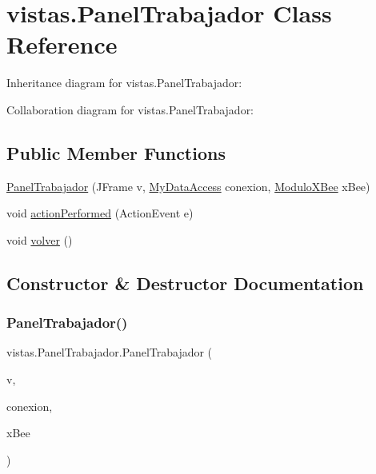 \hypertarget{classvistas_1_1_panel_trabajador}{}\section{vistas.\+Panel\+Trabajador Class Reference}
\label{classvistas_1_1_panel_trabajador}


Inheritance diagram for vistas.\+Panel\+Trabajador\+:


Collaboration diagram for vistas.\+Panel\+Trabajador\+:
\subsection*{Public Member Functions}
\begin{DoxyCompactItemize}
\item 
\mbox{\hyperlink{classvistas_1_1_panel_trabajador_ab7a4dda35afeed617350db7c07e8ae75}{Panel\+Trabajador}} (J\+Frame v, \mbox{\hyperlink{classconexion_s_q_l_1_1_my_data_access}{My\+Data\+Access}} conexion, \mbox{\hyperlink{classcomunicacion_1_1_modulo_x_bee}{Modulo\+X\+Bee}} x\+Bee)
\item 
void \mbox{\hyperlink{classvistas_1_1_panel_trabajador_ae6aeca3b9043ba1436533bba88d2406f}{action\+Performed}} (Action\+Event e)
\item 
void \mbox{\hyperlink{classvistas_1_1_panel_trabajador_a6779de800f0fec989da14137bcc8dc15}{volver}} ()
\end{DoxyCompactItemize}


\subsection{Constructor \& Destructor Documentation}
\mbox{\label{classvistas_1_1_panel_trabajador_ab7a4dda35afeed617350db7c07e8ae75}} 
\subsubsection{\texorpdfstring{Panel\+Trabajador()}{PanelTrabajador()}}
{\footnotesize\ttfamily vistas.\+Panel\+Trabajador.\+Panel\+Trabajador (\begin{DoxyParamCaption}\item[{J\+Frame}]{v,  }\item[{\mbox{\hyperlink{classconexion_s_q_l_1_1_my_data_access}{My\+Data\+Access}}}]{conexion,  }\item[{\mbox{\hyperlink{classcomunicacion_1_1_modulo_x_bee}{Modulo\+X\+Bee}}}]{x\+Bee }\end{DoxyParamCaption})\hspace{0.3cm}{\ttfamily [inline]}}

